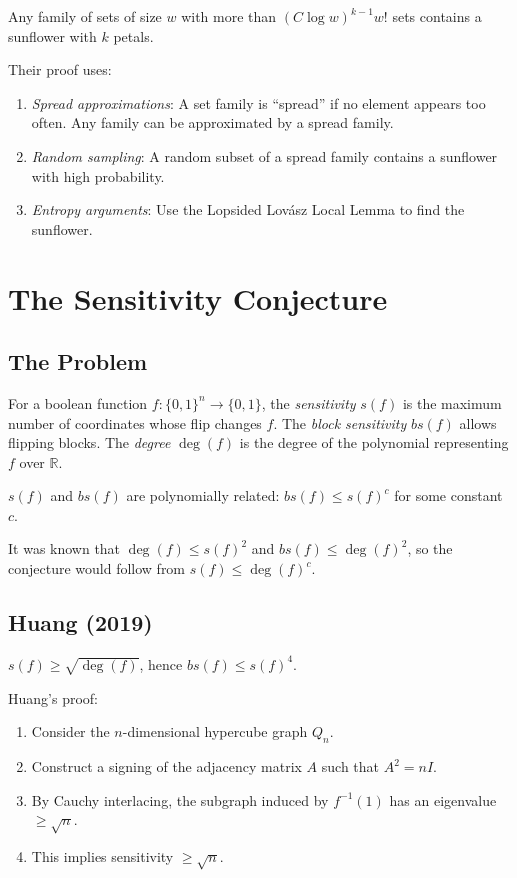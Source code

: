 \begin{theorem}
Any family of sets of size $w$ with more than $(C \log w)^{k-1} w!$ sets contains a sunflower with $k$ petals.
\end{theorem}

Their proof uses:
\begin{enumerate}
\item \emph{Spread approximations}: A set family is ``spread'' if no element appears too often. Any family can be approximated by a spread family.
\item \emph{Random sampling}: A random subset of a spread family contains a sunflower with high probability.
\item \emph{Entropy arguments}: Use the Lopsided Lovász Local Lemma to find the sunflower.
\end{enumerate}

\section{The Sensitivity Conjecture}

\subsection{The Problem}
For a boolean function $f: \{0,1\}^n \to \{0,1\}$, the \emph{sensitivity} $s(f)$ is the maximum number of coordinates whose flip changes $f$. The \emph{block sensitivity} $bs(f)$ allows flipping blocks. The \emph{degree} $\deg(f)$ is the degree of the polynomial representing $f$ over $\mathbb{R}$.

\begin{conjecture}
$s(f)$ and $bs(f)$ are polynomially related: $bs(f) \le s(f)^c$ for some constant $c$.
\end{conjecture}

It was known that $\deg(f) \le s(f)^2$ and $bs(f) \le \deg(f)^2$, so the conjecture would follow from $s(f) \le \deg(f)^c$.

\subsection{Huang (2019)}

\begin{theorem}
$s(f) \ge \sqrt{\deg(f)}$, hence $bs(f) \le s(f)^4$.
\end{theorem}

Huang's proof:
\begin{enumerate}
\item Consider the $n$-dimensional hypercube graph $Q_n$.
\item Construct a signing of the adjacency matrix $A$ such that $A^2 = n I$.
\item By Cauchy interlacing, the subgraph induced by $f^{-1}(1)$ has an eigenvalue $\ge \sqrt{n}$.
\item This implies sensitivity $\ge \sqrt{n}$.
\end{enumerate}

